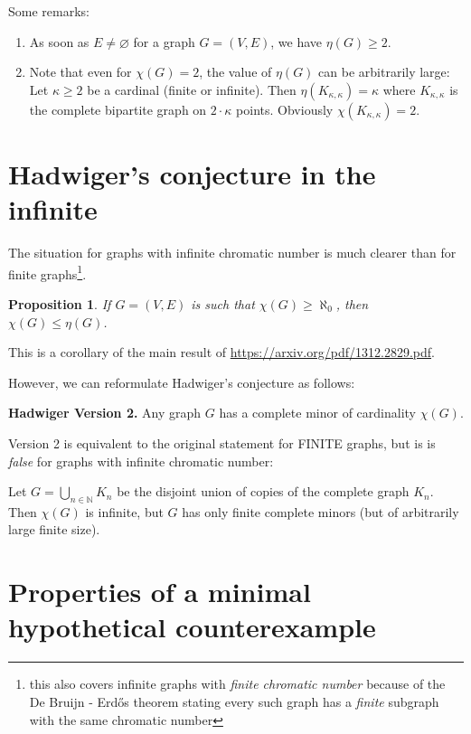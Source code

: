 \documentclass[12pt, a4paper]{amsart}
\newtheorem{proposition}[lemma]{\bf Proposition}
\begin{document}
Some remarks:

\begin{enumerate}
\item As soon as $E \neq \varnothing$ for a graph $G=(V,E)$,
	we have $\eta(G) \geq 2.$
\item Note that even for $\chi(G)=2$, the value of $\eta(G)$ can 
	be arbitrarily large: Let $\kappa\geq 2$ be a cardinal (finite
		or infinite). Then $\eta(K_{\kappa,\kappa}) = \kappa$
		where $K_{\kappa, \kappa}$ is the complete bipartite
		graph on $2\cdot \kappa$ points. Obviously
		$\chi(K_{\kappa,\kappa}) = 2$.
\end{enumerate}

\section{Hadwiger's conjecture in the infinite}
The situation for graphs with infinite chromatic number is much
clearer than for finite graphs\footnote{this also covers infinite graphs 
with {\em finite chromatic number} because of the De Bruijn - Erd\H{o}s
theorem stating every such graph has a {\em finite} subgraph
with the same chromatic number}.
\begin{proposition} If $G=(V,E)$ is such that $\chi(G)\geq \aleph_0$, 
	then $\chi(G)\leq \eta(G)$.
\end{proposition}
This is a corollary of the main result of 
\url{https://arxiv.org/pdf/1312.2829.pdf}.

However, we can reformulate Hadwiger's conjecture as follows:

{\bf Hadwiger Version 2.} Any graph $G$ has a complete minor of 
cardinality $\chi(G)$.

Version 2 is equivalent to the original statement for FINITE graphs,
but is is {\em false} for graphs with infinite chromatic number:

Let $G = \bigcup_{n\in \mathbb{N}}K_n$ be the disjoint union of copies of
the complete graph $K_n$. Then $\chi(G)$ is infinite, but $G$ has
only finite complete minors (but of arbitrarily large finite size).

\section{Properties of a minimal hypothetical counterexample}
\end{document}
